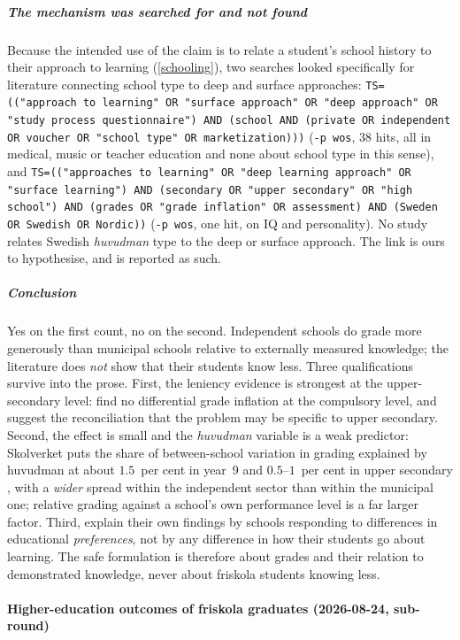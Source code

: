 \subparagraph{The mechanism was searched for and not found}
Because the intended use of the claim is to relate a student's school
history to their approach to learning
(\cref{schooling}), two searches looked specifically for
literature connecting school type to deep and surface approaches:
\texttt{TS=(("approach to learning" OR "surface approach" OR "deep
approach" OR "study process questionnaire") AND (school AND (private OR
independent OR voucher OR "school type" OR marketization)))}
(\texttt{-p wos}, 38 hits, all in medical, music or teacher education and
none about school type in this sense), and
\texttt{TS=(("approaches to learning" OR "deep learning approach" OR
"surface learning") AND (secondary OR "upper secondary" OR "high school")
AND (grades OR "grade inflation" OR assessment) AND (Sweden OR Swedish OR
Nordic))} (\texttt{-p wos}, one hit, on IQ and personality).
No study relates Swedish \emph{huvudman} type to the deep or surface
approach.  The link is ours to hypothesise, and is reported as such.

\subparagraph{Conclusion}
Yes on the first count, no on the second.  Independent schools do grade
more generously than municipal schools relative to externally measured
knowledge; the literature does \emph{not} show that their students know
less.  Three qualifications survive into the prose.
First, the leniency evidence is strongest at the upper-secondary level:
\textcite{BohlmarkLindahl2015} find no differential grade inflation at
the compulsory level, and \textcite{EdmarkPersson2021} suggest the
reconciliation that the problem may be specific to upper secondary.
Second, the effect is small and the \emph{huvudman} variable is a weak
predictor: Skolverket puts the share of between-school variation in
grading explained by huvudman at about \(1.5\)~per cent in year~9
\autocite{Skolverket2019Betyg} and \(0.5\)--\(1\)~per cent in upper
secondary \autocite{Skolverket2020Betyg}, with a \emph{wider} spread within
the independent sector than within the municipal one; relative grading
against a school's own performance level is a far larger factor.
Third, \textcite{HinnerichVlachos2017} explain their own findings by
schools responding to differences in educational \emph{preferences}, not
by any difference in how their students go about learning.
The safe formulation is therefore about grades and their relation to
demonstrated knowledge, never about friskola students knowing less.

\paragraph{Higher-education outcomes of friskola graduates (2026-08-24,
sub-round)}

